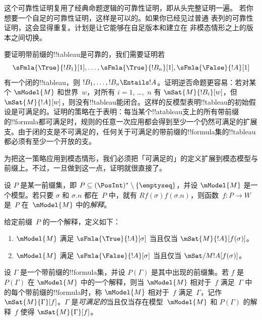 \documentclass[../../../include/open-logic-section]{subfiles}
\begin{document}


\begin{editorial}
  这个可靠性证明复用了经典命题逻辑的可靠性证明，即从头完整证明一遍。
  若你想要一个自足的可靠性证明，这样是可以的。如果你已经见过普通
  表列的可靠性证明，这会显得重复。计划是让它能够在自足版本和建立在
  非模态情形之上的版本之间切换。
\end{editorial}

\begin{explain}
  要证明带前缀的!!{tableau}是可靠的，我们需要证明若
  \[
  \sFmla{\True}{!B_1}[1], \dots, \sFmla{\True}{!B_n}[1], \sFmla{\False}{!A}[1]
  \]
  有一个闭的!!{tableau}，则 $!B_1, \dots, !B_n \Entails !A$。证明逆否命题更容易：若对某个 $\mModel{M}$ 和世界~$w$，对所有 $i=1$, \dots,~$n$ 有 $\mSat{M}{!B_i}[w]$，但 $\mSat{M}{!A}[w]$，则没有!!{tableau}能闭合。这样的反模型表明!!{tableau}的初始假设是可满足的。证明的策略在于表明：每当某个!!a{tableau}支上的所有带前缀的!!{formula}都可满足时，规则的任意一次应用都会得到至少一个仍然可满足的扩展支。由于闭的支是不可满足的，任何关于可满足的带前缀的!!{formula}集的!!{tableau}都必须有至少一个开放的支。

  为把这一策略应用到模态情形，我们必须把「可满足的」的定义扩展到模态模型与前缀上。不过，一旦做到这一点，证明就很直接了。
\end{explain}

\begin{defn}
  设 $P$ 是某一前缀集，即 $P \subseteq (\PosInt)^*
  \setminus \{\emptyseq\}$，并设 $\mModel{M}$ 是一个模型。若只要 $\sigma$ 和 $\sigma.n$ 都在~$P$ 中，就有 $Rf(\sigma)f(\sigma.n)$，则函数~$f\colon P \to W$ 是~$P$ 在~$\mModel{M}$ 中的\emph{解释}。

  给定前缀~$P$ 的一个解释，定义如下：
  \begin{enumerate}
  \item $\mModel{M}$ 满足 $\sFmla{\True}{!A}[\sigma]$ 当且仅当 $\mSat{M}{!A}[f(\sigma)]$。
  \item $\mModel{M}$ 满足 $\sFmla{\False}{!A}[\sigma]$ 当且仅当 $\mSat/{M}{!A}[f(\sigma)]$。
  \end{enumerate}
\end{defn}

\begin{defn}
  设 $\Gamma$ 是一个带前缀的!!{formula}集，并设 $P(\Gamma)$ 是其中出现的前缀集。若 $f$ 是~$P(\Gamma)$ 在 $\mModel{M}$ 中的一个解释，则当 $\mModel{M}$ 相对于~$f$ 满足~$\Gamma$ 中的每个带前缀的!!{formula}时，称 $\mModel{M}$ 相对于~$f$ 满足~$\Gamma$，记作 $\mSat{M}{\Gamma}[f]$。$\Gamma$ 是\emph{可满足的}当且仅当存在模型~$\mModel{M}$ 和 $P(\Gamma)$ 的解释~$f$ 使得 $\mSat{M}{\Gamma}[f]$。
\end{defn}
\end{document}

